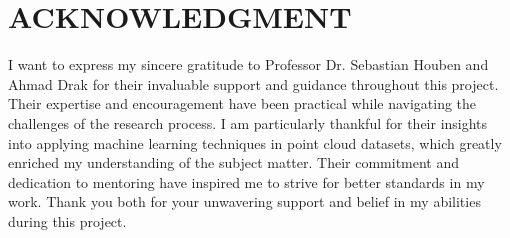 \documentclass[../report.tex]{subfiles}
\begin{document}
    \section*{ACKNOWLEDGMENT}
I want to express my sincere gratitude to Professor Dr. Sebastian Houben and Ahmad Drak for their invaluable support and guidance throughout this project. Their expertise and encouragement have been practical while navigating the challenges of the research process. I am particularly thankful for their insights into applying machine learning techniques in point cloud datasets, which greatly enriched my understanding of the subject matter. Their commitment and dedication to mentoring have inspired me to strive for better standards in my work. Thank you both for your unwavering support and belief in my abilities during this project.
\end{document}
